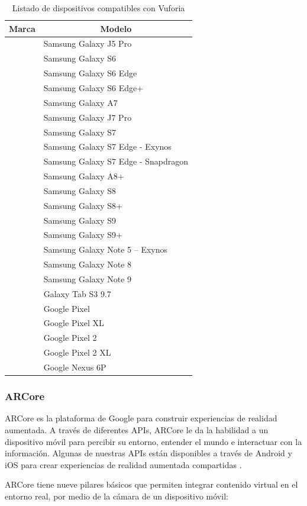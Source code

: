 \begin{table}[]
	\begin{tabular}{| p{4.5cm} | p{10.5cm} |}
		\hline \centering
		\textbf{Marca}              & \multicolumn{1}{c|}{\textbf{Modelo}}               \\ \hline \centering
\multirow{5}{*}{Samsumg}     & Samsung Galaxy J5 Pro                       \\ \cline{2-2} 														  
& Samsung Galaxy S6   \\ \cline{2-2}
& Samsung Galaxy S6 Edge   \\ \cline{2-2}
& Samsung Galaxy S6 Edge+   \\ \cline{2-2}
& Samsung Galaxy A7   \\ \cline{2-2}
& Samsung Galaxy J7 Pro   \\ \cline{2-2}
& Samsung Galaxy S7   \\ \cline{2-2}
& Samsung Galaxy S7 Edge - Exynos   \\ \cline{2-2}
& Samsung Galaxy S7 Edge - Snapdragon   \\ \cline{2-2}
& Samsung Galaxy A8+   \\ \cline{2-2}
& Samsung Galaxy S8   \\ \cline{2-2}
& Samsung Galaxy S8+   \\ \cline{2-2}
& Samsung Galaxy S9   \\ \cline{2-2}
& Samsung Galaxy S9+   \\ \cline{2-2}
& Samsung Galaxy Note 5 – Exynos   \\ \cline{2-2}
& Samsung Galaxy Note 8   \\ \cline{2-2}
& Samsung Galaxy Note 9    \\ \cline{2-2}
& Galaxy Tab S3 9.7  \\ \hline   \centering
\multirow{5}{*}{Google}    & Google Pixel              \\ \cline{2-2}
& Google Pixel XL   \\ \cline{2-2}
& Google Pixel 2   \\ \cline{2-2}
& Google Pixel 2 XL   \\ \cline{2-2}
& Google Nexus 6P    \\ \hline 
\end{tabular}
\captionsetup{justification=centering}
\caption{Listado de dispositivos compatibles con Vuforia}
\end{table}

\newpage
\noindent


\subsubsection{ARCore}
ARCore es la plataforma de Google para construir experiencias de realidad aumentada. A través de diferentes APIs, ARCore le da la habilidad a un dispositivo móvil para percibir su entorno, entender el mundo e interactuar con la información. Algunas de nuestras APIs están disponibles a través de Android y iOS para crear experiencias de realidad aumentada compartidas \cite{B14}.\par
ARCore tiene nueve pilares básicos que permiten integrar contenido virtual en el entorno real, por medio de la cámara de un dispositivo móvil:

